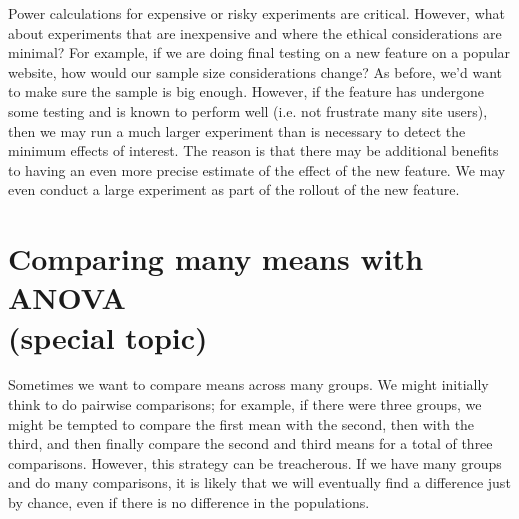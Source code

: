 Power calculations for expensive or risky experiments are critical. However, what about experiments that are inexpensive and where the ethical considerations are minimal? For example, if we are doing final testing on a new feature on a popular website, how would our sample size considerations change? As before, we'd want to make sure the sample is big enough. However, if the feature has undergone some testing and is known to perform well (i.e. not frustrate many site users), then we may run a much larger experiment than is necessary to detect the minimum effects of interest. The reason is that there may be additional benefits to having an even more precise estimate of the effect of the new feature. We may even conduct a large experiment as part of the rollout of the new feature.



\textC{\newpage}



\section[Comparing many means with ANOVA (special topic)]{Comparing many means with ANOVA\\(special topic)}
\label{anovaAndRegrWithCategoricalVariables}


Sometimes we want to compare means across many groups. We might initially think to do pairwise comparisons; for example, if there were three groups, we might be tempted to compare the first mean with the second, then with the third, and then finally compare the second and third means for a total of three comparisons. However, this strategy can be treacherous. If we have many groups and do many comparisons, it is likely that we will eventually find a difference just by chance, even if there is no difference in the populations.

